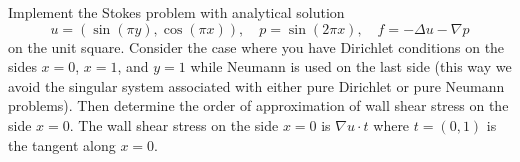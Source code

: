 \begin{exercise}{6.7}
    Implement the Stokes problem with analytical solution
    \begin{equation*}
        u = (\sin(\pi y), \cos(\pi x)),
        \quad p = \sin(2 \pi x),
        \quad f = -\Delta u - \nabla p
    \end{equation*}
    on the unit square.
    Consider the case where you have Dirichlet conditions on the sides $x = 0$, $x = 1$, and $y = 1$ while Neumann is used on the last side (this way we avoid the singular system associated with either pure Dirichlet or pure Neumann problems).
    Then determine the order of approximation of wall shear stress on the side $x = 0$.
    The wall shear stress on the side $x = 0$ is $\nabla u \cdot t$ where $t = (0, 1)$ is the tangent along $x = 0$.
\end{exercise}